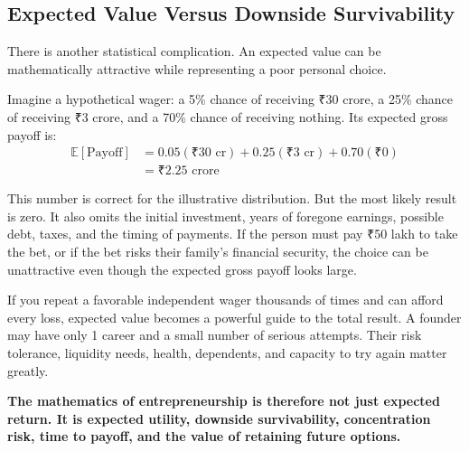 \subsection{Expected Value Versus Downside Survivability}

There is another statistical complication. An expected value can be mathematically attractive while representing a poor personal choice.

Imagine a hypothetical wager: a 5\% chance of receiving ₹30 crore, a 25\% chance of receiving ₹3 crore, and a 70\% chance of receiving nothing. Its expected gross payoff is:
\begin{equation}
\begin{split}
  \mathbb{E}[\text{Payoff}] &= 0.05(₹30\text{ cr}) + 0.25(₹3\text{ cr}) + 0.70(₹0) \\
  &= ₹2.25\text{ crore}
\end{split}
\label{eq:expected-payoff}
\end{equation}

This number is correct for the illustrative distribution. But the most likely result is zero. It also omits the initial investment, years of foregone earnings, possible debt, taxes, and the timing of payments. If the person must pay ₹50 lakh to take the bet, or if the bet risks their family's financial security, the choice can be unattractive even though the expected gross payoff looks large.

If you repeat a favorable independent wager thousands of times and can afford every loss, expected value becomes a powerful guide to the total result. A founder may have only 1 career and a small number of serious attempts. Their risk tolerance, liquidity needs, health, dependents, and capacity to try again matter greatly.

\textbf{The mathematics of entrepreneurship is therefore not just expected return. It is expected utility, downside survivability, concentration risk, time to payoff, and the value of retaining future options.}
